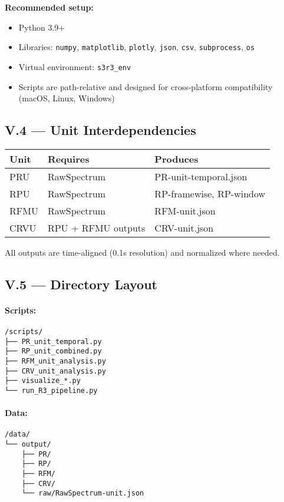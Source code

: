 \textbf{Recommended setup:}

\begin{itemize}
    \item Python 3.9+
    \item Libraries: \texttt{numpy}, \texttt{matplotlib}, \texttt{plotly}, \texttt{json}, \texttt{csv}, \texttt{subprocess}, \texttt{os}
    \item Virtual environment: \texttt{s3r3\_env}
    \item Scripts are path-relative and designed for cross-platform compatibility (macOS, Linux, Windows)
\end{itemize}

\subsection*{V.4 — Unit Interdependencies}

\begin{center}
\begin{tabular}{|l|l|l|}
\hline
\textbf{Unit} & \textbf{Requires} & \textbf{Produces} \\
\hline
PRU & RawSpectrum & PR-unit-temporal.json \\
RPU & RawSpectrum & RP-framewise, RP-window \\
RFMU & RawSpectrum & RFM-unit.json \\
CRVU & RPU + RFMU outputs & CRV-unit.json \\
\hline
\end{tabular}
\end{center}

All outputs are time-aligned (0.1s resolution) and normalized where needed.

\subsection*{V.5 — Directory Layout}

\paragraph{Scripts:}
\begin{verbatim}
/scripts/
├── PR_unit_temporal.py
├── RP_unit_combined.py
├── RFM_unit_analysis.py
├── CRV_unit_analysis.py
├── visualize_*.py
└── run_R3_pipeline.py
\end{verbatim}

\paragraph{Data:}
\begin{verbatim}
/data/
└── output/
    ├── PR/
    ├── RP/
    ├── RFM/
    ├── CRV/
    └── raw/RawSpectrum-unit.json
\end{verbatim}

